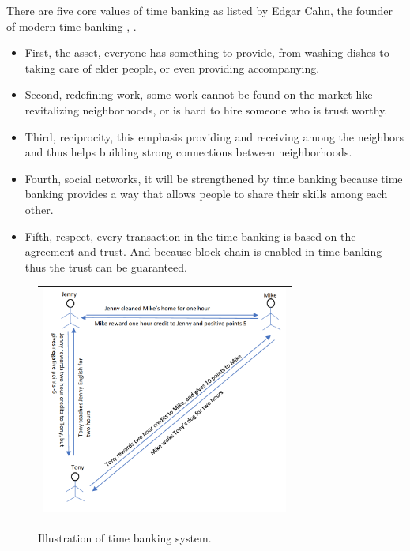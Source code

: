 \documentclass[conference]{IEEEtran}
\begin{document}
There are five core values of time banking as listed by Edgar Cahn, the founder of modern time banking \cite{cahn2011time}, \cite{cahn2000no}.

\begin{itemize}
   \item First, the asset, everyone has something to provide, from washing dishes to taking care of elder people, or even providing accompanying. 
   \item Second, redefining work, some work cannot be found on the market like revitalizing neighborhoods, or is hard to hire someone who is trust worthy. 
   \item Third, reciprocity, this emphasis providing and receiving among the neighbors and thus helps building strong connections between neighborhoods. 
   \item Fourth, social networks, it will be strengthened by time banking because time banking provides a way that allows people to share their skills among each other. 
   \item Fifth, respect, every transaction in the time banking is based on the agreement and trust. And because block chain is enabled in time banking thus the trust can be guaranteed. 
 \end{itemize}

\begin{figure} [t]
\begin{center}
\begin{tabular}{c}
\includegraphics[height=7.5cm]{time_bank_picture}
\end{tabular}
\end{center}
\caption[example] {\label{fig:1-time banking} Illustration of time banking system.}
\vspace{-10pt}
\end{figure}
\end{document}
